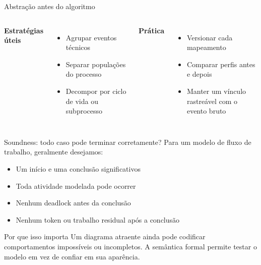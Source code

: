 \documentclass[aspectratio=169,11pt]{beamer}
\begin{document}
\begin{frame}{Abstração antes do algoritmo}
  \centering
  \vspace{0.55cm}
  \begin{columns}[T,onlytextwidth]
      \textbf{Estratégias úteis}
      \begin{itemize}
        \item Agrupar eventos técnicos
        \item Separar populações do processo
        \item Decompor por ciclo de vida ou subprocesso
      \end{itemize}
      \textbf{Prática}
      \begin{itemize}
        \item Versionar cada mapeamento
        \item Comparar perfis antes e depois
        \item Manter um vínculo rastreável com o evento bruto
      \end{itemize}
  \end{columns}
\end{frame}

\begin{frame}{Soundness: todo caso pode terminar corretamente?}
  Para um modelo de fluxo de trabalho, geralmente desejamos:
  \begin{itemize}
    \item Um início e uma conclusão significativos
    \item Toda atividade modelada pode ocorrer
    \item Nenhum deadlock antes da conclusão
    \item Nenhum token ou trabalho residual após a conclusão
  \end{itemize}
  \vspace{0.35cm}
  \begin{block}{Por que isso importa}
    Um diagrama atraente ainda pode codificar comportamentos impossíveis ou incompletos.
    A semântica formal permite testar o modelo em vez de confiar em sua aparência.
  \end{block}
\end{frame}
\end{document}
